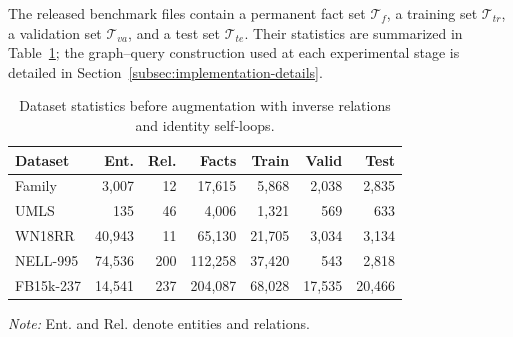\documentclass[a4paper,fleqn]{cas-dc}
\newcommand{\papertablestyle}{%
  \footnotesize
  \renewcommand{\arraystretch}{1.12}%
  \setlength{\tabcolsep}{3pt}%
}
\begin{document}
The released benchmark files contain a permanent fact set $\mathcal{T}_{f}$, a training set $\mathcal{T}_{tr}$, a validation set $\mathcal{T}_{va}$, and a test set $\mathcal{T}_{te}$. Their statistics are summarized in Table~\ref{tab:dataset-statistics}; the graph--query construction used at each experimental stage is detailed in Section~\ref{subsec:implementation-details}.

\begin{table}[width=\columnwidth,pos=t]
\caption{Dataset statistics before augmentation with inverse relations and identity self-loops.}
\label{tab:dataset-statistics}
\centering
\papertablestyle
\setlength{\tabcolsep}{1.5pt}
\begin{tabular*}{\linewidth}{@{}l@{\extracolsep{\fill}}rrrrrr@{}}
\toprule
Dataset & Ent. & Rel. & Facts & Train & Valid & Test \\
\midrule
Family & 3,007 & 12 & 17,615 & 5,868 & 2,038 & 2,835 \\
UMLS & 135 & 46 & 4,006 & 1,321 & 569 & 633 \\
WN18RR & 40,943 & 11 & 65,130 & 21,705 & 3,034 & 3,134 \\
NELL-995 & 74,536 & 200 & 112,258 & 37,420 & 543 & 2,818 \\
FB15k-237 & 14,541 & 237 & 204,087 & 68,028 & 17,535 & 20,466 \\
\bottomrule
\end{tabular*}
\par\smallskip
\parbox{\linewidth}{\footnotesize\emph{Note:} Ent. and Rel. denote entities and relations.}
\end{table}
\end{document}
